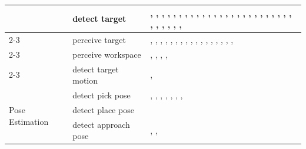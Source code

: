 \begin{table}[!h]
\begin{tabular}{|p{4cm}|p{5cm}|p{15cm}|}
    & detect target          & \cite{Weser2009AutonomousPF}, \cite{Frasca2020GoingCA}, \cite{Stckler2013IncreasingFO}, \cite{Stckler2009IntegratingIM}, \cite{Kenney2009InteractiveSF}, \cite{Pedersen2014IntuitiveSP}, \cite{Pohl2024MAkEableMA}, \cite{Li2019ManipulationSA}, \cite{Shi2012MobileRA}, \cite{Partovi2017ReactiveIM}, \cite{Deng2017ReinforcementLO}, \cite{Li2017ReinforcementLO}, \cite{Peng2024RevolutionizingBD}, \cite{Lim2008MultipleHC}, \cite{Kiyokawa2025SelfSupervisedLO}, \cite{Lim2019SkillbasedAA}, \cite{Amaral2017SkillbasedAA}, \cite{Chang2006ABB}, \cite{MacKenzie1996BehaviorbasedMM}, \cite{Choi2009HandIO}, \cite{Nagatani2000MotionDF}, \cite{Beetz2011GeneralityAL}, \cite{Yang2026VisionLanguageActionME}, \cite{Lee2023DevelopmentAV}, \cite{Akkaladevi2024TowardsAB}, \cite{engelbracht2024spotlightroboticsceneunderstanding}, \cite{Lopes2026CARGOAM}, \cite{Gupta2025PreciseMM}, \cite{Xiao2025AutonomousBC}, \cite{Williams2012ARA}, \cite{Fu2024MobileAL}, \cite{Yokoyama2023ASCAS} \\
\cline{2-3}
    & perceive target        & \cite{Holz2015ASS}, \cite{Stckler2014AdaptiveTS}, \cite{Weser2009AutonomousPF}, \cite{Bruemmer2010BehaviorBC}, \cite{Pedersen2015GestureBasedEO}, \cite{Frasca2020GoingCA}, \cite{Stckler2013IncreasingFO}, \cite{Stckler2009IntegratingIM}, \cite{Pedersen2014IntuitiveSP}, \cite{Tsay2010MaterialHO}, \cite{Kostavelis2022RoboticAI}, \cite{Lim2019SkillbasedAA}, \cite{Stroupe2005BehaviorbasedMC}, \cite{Choi2009HandIO}, \cite{Lee2025LearningCL}, \cite{Gupta2025PreciseMM}, \cite{Wu2024InTW}, \cite{Shi2021MaximizingTU} \\
\cline{2-3}
    & perceive workspace     & \cite{Holz2015ASS}, \cite{Yamazaki2012HomeAssistantRF}, \cite{Schwarz2016HybridDL}, \cite{Pimentel2002OnTD}, \cite{Knobbe2022CorePI} \\
\cline{2-3}
    & detect target motion   & \cite{Kenney2009InteractiveSF}, \cite{Lim2019SkillbasedAA} \\
\hline
\multirow{3}{*}{\parbox{3cm}{Pose Estimation}}
    & detect pick pose       & \cite{Mitrevski2019LucyTT}, \cite{Holz2015ASS}, \cite{Stckler2014EfficientDR}, \cite{Youngquist2022EvaluatingSA}, \cite{Toner2024PRFAP}, \cite{Andrian2005EmbeddedCI}, \cite{Gupta2025PreciseMM}, \cite{Fu2024MobileAL} \\
\cline{2-3}
    & detect place pose      & \cite{Forster2020AutomaticEO} \\
\cline{2-3}
    & detect approach pose   & \cite{Weser2009AutonomousPF}, \cite{Lopes2026CARGOAM}, \cite{Lee2025LearningCL} \\

\end{tabular}
\end{table}
